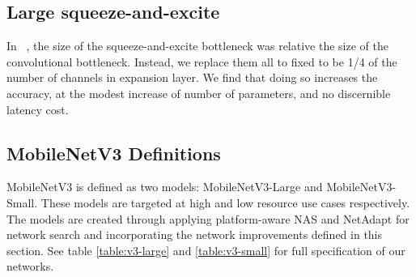\documentclass[10pt,twocolumn,letterpaper]{article}
\begin{document}
\subsection{Large squeeze-and-excite}
In ~\cite{mnasnet}, the size of the squeeze-and-excite bottleneck was relative the size of the convolutional bottleneck. Instead, we replace them all to fixed to be 1/4 of the number of channels in  expansion layer.  We find that doing so increases the accuracy, at the modest increase of number of  parameters, and no discernible latency cost. 

\subsection{MobileNetV3 Definitions}
MobileNetV3 is defined as two models: MobileNetV3-Large and MobileNetV3-Small. These models are targeted at high and low resource use cases respectively. The models are created through applying platform-aware NAS and NetAdapt for network search and incorporating the network improvements defined in this section. See table \ref{table:v3-large} and \ref{table:v3-small} for full specification of our networks.
\end{document}
